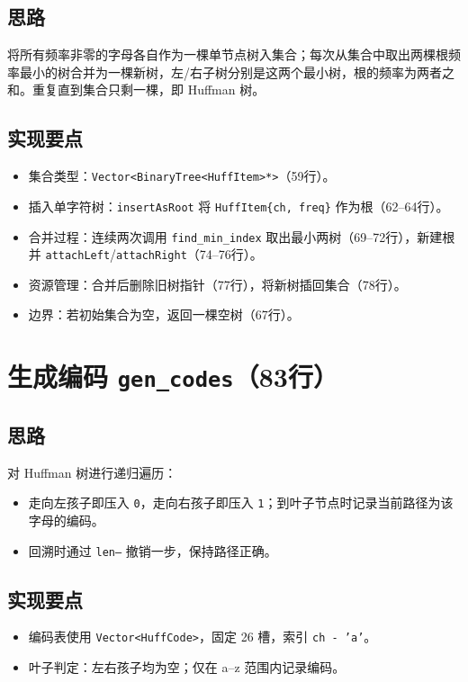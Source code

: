 \documentclass[12pt]{article}
\begin{document}
\subsection*{思路}
将所有频率非零的字母各自作为一棵单节点树入集合；每次从集合中取出两棵根频率最小的树合并为一棵新树，左/右子树分别是这两个最小树，根的频率为两者之和。重复直到集合只剩一棵，即 Huffman 树。

\subsection*{实现要点}
\begin{itemize}[leftmargin=1.4em]
  \item 集合类型：\texttt{Vector<BinaryTree<HuffItem>*>}（59行）。
  \item 插入单字符树：\texttt{insertAsRoot} 将 \texttt{HuffItem\{ch, freq\}} 作为根（62--64行）。
  \item 合并过程：连续两次调用 \texttt{find\_min\_index} 取出最小两树（69--72行），新建根并 \texttt{attachLeft}/\texttt{attachRight}（74--76行）。
  \item 资源管理：合并后删除旧树指针（77行），将新树插回集合（78行）。
  \item 边界：若初始集合为空，返回一棵空树（67行）。
\end{itemize}

\section{生成编码 \texttt{gen\_codes}（83行）}
\subsection*{思路}
对 Huffman 树进行递归遍历：
\begin{itemize}[leftmargin=1.4em]
  \item 走向左孩子即压入 \texttt{0}，走向右孩子即压入 \texttt{1}；到叶子节点时记录当前路径为该字母的编码。
  \item 回溯时通过 \texttt{len--} 撤销一步，保持路径正确。
\end{itemize}

\subsection*{实现要点}
\begin{itemize}[leftmargin=1.4em]
  \item 编码表使用 \texttt{Vector<HuffCode>}，固定 26 槽，索引 \texttt{ch - 'a'}。
  \item 叶子判定：左右孩子均为空；仅在 a--z 范围内记录编码。
\end{itemize}
\end{document}

